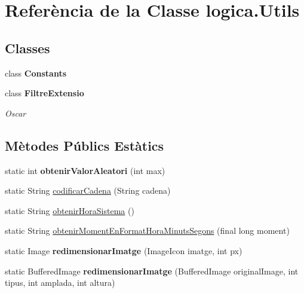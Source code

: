 \hypertarget{classlogica_1_1_utils}{\section{Referència de la Classe logica.\+Utils}
\label{classlogica_1_1_utils}
}
\subsection*{Classes}
\begin{DoxyCompactItemize}
\item 
class {\bfseries Constants}
\item 
class {\bfseries Filtre\+Extensio}
\begin{DoxyCompactList}\small\item\em Oscar \end{DoxyCompactList}\end{DoxyCompactItemize}
\subsection*{Mètodes Públics Estàtics}
\begin{DoxyCompactItemize}
\item 
\hypertarget{classlogica_1_1_utils_a9b70eb7cd5d0abf2938c68baa3034894}{static int {\bfseries obtenir\+Valor\+Aleatori} (int max)}\label{classlogica_1_1_utils_a9b70eb7cd5d0abf2938c68baa3034894}

\item 
static String \hyperlink{classlogica_1_1_utils_a66b968a61334d9723942ad3a9e621fbd}{codificar\+Cadena} (String cadena)
\item 
static String \hyperlink{classlogica_1_1_utils_aaf9d9b176acc66d9c2e9ba977a22f414}{obtenir\+Hora\+Sistema} ()
\item 
static String \hyperlink{classlogica_1_1_utils_a621092fb3c75d5fc727ed3708ee00f24}{obtenir\+Moment\+En\+Format\+Hora\+Minuts\+Segons} (final long moment)
\item 
\hypertarget{classlogica_1_1_utils_a5c0e404e667ec5f7fdac6a244b224098}{static Image {\bfseries redimensionar\+Imatge} (Image\+Icon imatge, int px)}\label{classlogica_1_1_utils_a5c0e404e667ec5f7fdac6a244b224098}

\item 
\hypertarget{classlogica_1_1_utils_aaf930ea3e64076e1058757013226f044}{static Buffered\+Image {\bfseries redimensionar\+Imatge} (Buffered\+Image original\+Image, int tipus, int amplada, int altura)}\label{classlogica_1_1_utils_aaf930ea3e64076e1058757013226f044}

\end{DoxyCompactItemize}


